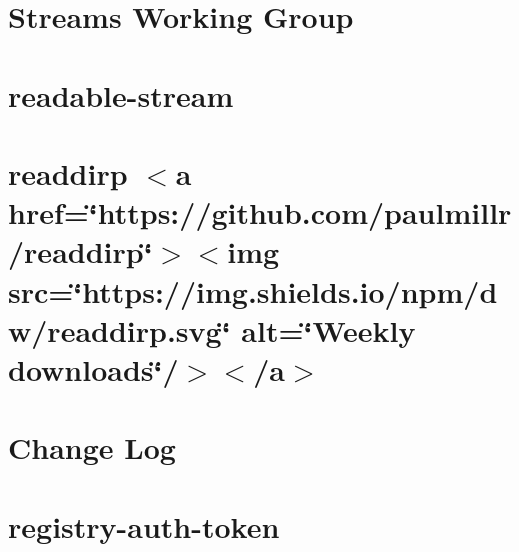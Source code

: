 \let\mypdfximage\pdfximage\def\pdfximage{\immediate\mypdfximage}\documentclass[twoside]{book}
\newcommand{\+}{\discretionary{\mbox{\scriptsize$\hookleftarrow$}}{}{}}
\begin{document}
\chapter{Streams Working Group}
\label{md__c_1__git_hub__p_r_o_y_e_c_t_o-_i_i_i-_g_o_t_rest-api-node-mysql_node_modules_readable-stream__g_o_v_e_r_n_a_n_c_e}

\chapter{readable-\/stream}
\label{md__c_1__git_hub__p_r_o_y_e_c_t_o-_i_i_i-_g_o_t_rest-api-node-mysql_node_modules_readable-stream__r_e_a_d_m_e}

\chapter{readdirp $<$a href=\char`\"{}https\+://github.\+com/paulmillr/readdirp\char`\"{}$>$$<$img src=\char`\"{}https\+://img.\+shields.\+io/npm/dw/readdirp.\+svg\char`\"{} alt=\char`\"{}\+Weekly downloads\char`\"{}/$>$$<$/a$>$}
\label{md__c_1__git_hub__p_r_o_y_e_c_t_o-_i_i_i-_g_o_t_rest-api-node-mysql_node_modules_readdirp__r_e_a_d_m_e}

\chapter{Change Log}
\label{md__c_1__git_hub__p_r_o_y_e_c_t_o-_i_i_i-_g_o_t_rest-api-node-mysql_node_modules_registry-auth-token__c_h_a_n_g_e_l_o_g}

\chapter{registry-\/auth-\/token}
\label{md__c_1__git_hub__p_r_o_y_e_c_t_o-_i_i_i-_g_o_t_rest-api-node-mysql_node_modules_registry-auth-token__r_e_a_d_m_e}

\end{document}
